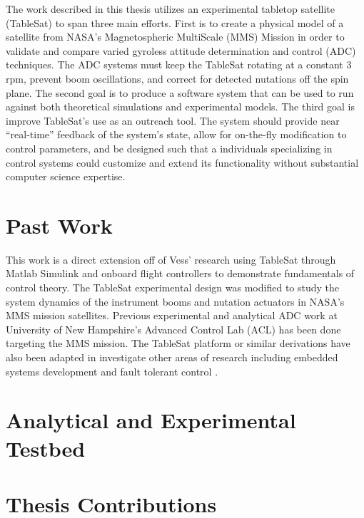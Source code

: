 The work described in this thesis utilizes an experimental tabletop satellite (TableSat) \cite{vessthesis} to span three main efforts.  First is to create a physical model of a satellite from NASA's Magnetospheric MultiScale (MMS) Mission in order to validate and compare varied gyroless attitude determination and control (ADC) techniques.  The ADC systems must keep the TableSat rotating at a constant 3 rpm, prevent boom oscillations, and correct for detected nutations off the spin plane.  The second goal is to produce a software system that can be used to run against both theoretical simulations and experimental models.  The third goal is improve TableSat's use as an outreach tool.  The system should provide near ``real-time'' feedback of the system's state, allow for on-the-fly modification to control parameters, and be designed such that a individuals specializing in control systems could customize and extend its functionality without substantial computer science expertise.

\section{Past Work}
\label{sec:PastWork}

This work is a direct extension off of Vess' \cite{vessthesis} research using TableSat through Matlab Simulink and onboard flight controllers to demonstrate fundamentals of control theory.  The TableSat experimental design was modified to study the system dynamics of the instrument booms and nutation actuators in NASA's MMS mission satellites.  Previous experimental \cite{tsat1b} \cite{tsat1c} \cite{tsat2} and analytical \cite{mushawehthesis} ADC work at University of New Hampshire's Advanced Control Lab (ACL) has been done targeting the MMS mission.  The TableSat platform or similar derivations have also been adapted in investigate other areas of research including embedded systems development \cite{tablesat_xuml} and fault tolerant control \cite{tablesat_object_bench} \cite{nanjing_university}.


\section{Analytical and Experimental Testbed}
\label{sec:AnalyticalandExperimentalTestbed}



\section{Thesis Contributions}
\label{sec:ThesisContributions}

